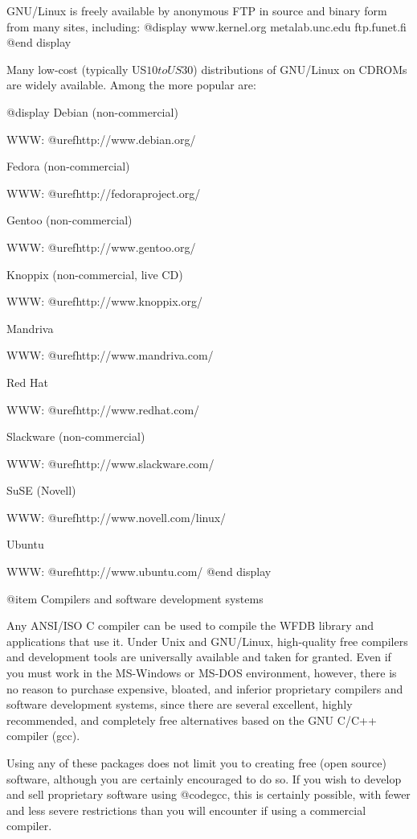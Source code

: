 {{{{{{{{GNU/Linux is freely available by anonymous FTP in source and binary form from
many sites, including:
@display
www.kernel.org
metalab.unc.edu
ftp.funet.fi
@end display

Many low-cost (typically US$10 to US$30) distributions of GNU/Linux on CDROMs
are widely available.  Among the more popular are:

@display
Debian (non-commercial)

WWW: @uref{http://www.debian.org/}


Fedora (non-commercial)

WWW: @uref{http://fedoraproject.org/}


Gentoo (non-commercial)

WWW: @uref{http://www.gentoo.org/}


Knoppix (non-commercial, live CD)

WWW: @uref{http://www.knoppix.org/}


Mandriva

WWW: @uref{http://www.mandriva.com/}


Red Hat

WWW: @uref{http://www.redhat.com/}


Slackware (non-commercial)

WWW: @uref{http://www.slackware.com/}


SuSE (Novell)

WWW: @uref{http://www.novell.com/linux/}


Ubuntu

WWW: @uref{http://www.ubuntu.com/}
@end display

@item Compilers and software development systems

Any ANSI/ISO C compiler can be used to compile the WFDB library and
applications that use it.  Under Unix and GNU/Linux, high-quality free
compilers and development tools are universally available and taken for
granted.  Even if you must work in the MS-Windows or MS-DOS environment,
however, there is no reason to purchase expensive, bloated, and inferior
proprietary compilers and software development systems, since there are several
excellent, highly recommended, and completely free alternatives based on the
GNU C/C++ compiler (gcc).

Using any of these packages does not limit you to creating free (open
source) software, although you are certainly encouraged to do so.  If you
wish to develop and sell proprietary software using @code{gcc}, this is
certainly possible, with fewer and less severe restrictions than you
will encounter if using a commercial compiler.

}}}}}}}}
